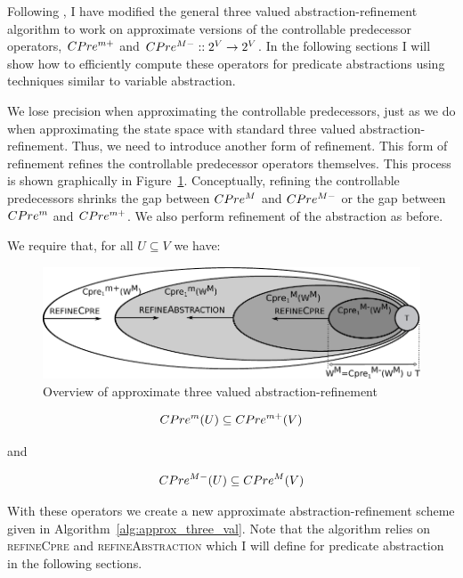 Following \cite{Alfaro_Roy_07}, I have modified the general three valued abstraction-refinement algorithm to work on approximate versions of the controllable predecessor operators, $CPre^{m+}$ and $CPre^{M-} :: 2^V \rightarrow 2^V$. In the following sections I will show how to efficiently compute these operators for predicate abstractions using techniques similar to variable abstraction. 

We lose precision when approximating the controllable predecessors, just as we do when approximating the state space with standard three valued abstraction-refinement. Thus, we need to introduce another form of refinement. This form of refinement refines the controllable predecessor operators themselves. This process is shown graphically in Figure~\ref{fig:approx_three_val_overview}. Conceptually, refining the controllable predecessors shrinks the gap between $CPre^M$ and $CPre^{M-}$ or the gap between $CPre^m$ and $CPre^{m+}$. We also perform refinement of the abstraction as before.

We require that, for all $U \subseteq V$ we have:

\begin{figure}
\centering
\includegraphics[width=0.85\linewidth]{imgs/approxThreeValue.pdf}
\caption{Overview of approximate three valued abstraction-refinement}
\label{fig:approx_three_val_overview}
\end{figure}


\begin{equation}
\label{eqn:cpre_p1}
CPre^m(U) \subseteq CPre^{m+}(V)
\end{equation}

\noindent and

\begin{equation}
\label{eqn:cpre_p2}
CPre^{M-}(U) \subseteq CPre^M(V)
\end{equation}

With these operators we create a new approximate abstraction-refinement scheme given in Algorithm~\ref{alg:approx_three_val}. Note that the algorithm relies on \textsc{refineCpre} and \textsc{refineAbstraction} which I will define for predicate abstraction in the following sections.

